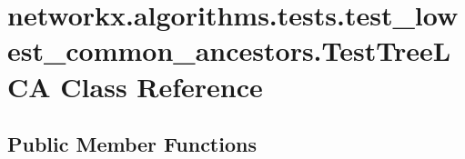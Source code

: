 \hypertarget{classnetworkx_1_1algorithms_1_1tests_1_1test__lowest__common__ancestors_1_1TestTreeLCA}{}\section{networkx.\+algorithms.\+tests.\+test\+\_\+lowest\+\_\+common\+\_\+ancestors.\+Test\+Tree\+L\+CA Class Reference}
\label{classnetworkx_1_1algorithms_1_1tests_1_1test__lowest__common__ancestors_1_1TestTreeLCA}
\subsection*{Public Member Functions}

